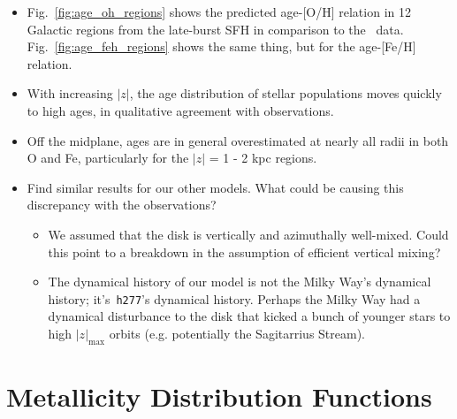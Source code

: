 \documentclass[a4paper, fleqn, usenatbib, useAMS]{mnras}
\begin{document}
\begin{itemize} 
	\item Fig.~\ref{fig:age_oh_regions} shows the predicted age-[O/H] relation 
	in 12 Galactic regions from the late-burst SFH in comparison to 
	the~\citet{Feuillet2019} data. Fig.~\ref{fig:age_feh_regions} shows the 
	same thing, but for the age-[Fe/H] relation. 

	\item With increasing $\left|z\right|$, the age distribution of stellar 
	populations moves quickly to high ages, in qualitative agreement with 
	observations. 

	\item Off the midplane, ages are in general overestimated at nearly all 
	radii in both O and Fe, particularly for the $\left|z\right|$ = 1 - 2 kpc 
	regions. 

	\item Find similar results for our other models. What could be causing this 
	discrepancy with the observations? 
	\begin{itemize} 
		\item We assumed that the disk is vertically and azimuthally well-mixed. 
		Could this point to a breakdown in the assumption of efficient vertical 
		mixing? 

		\item The dynamical history of our model is not the Milky Way's 
		dynamical history; it's~\texttt{h277}'s dynamical history. Perhaps the 
		Milky Way had a dynamical disturbance to the disk that kicked a bunch 
		of younger stars to high $\left|z\right|_\text{max}$ orbits (e.g. 
		potentially the Sagitarrius Stream). 
	\end{itemize} 
\end{itemize} 

\section{Metallicity Distribution Functions} 
\label{sec:mdfs} 
\end{document}
